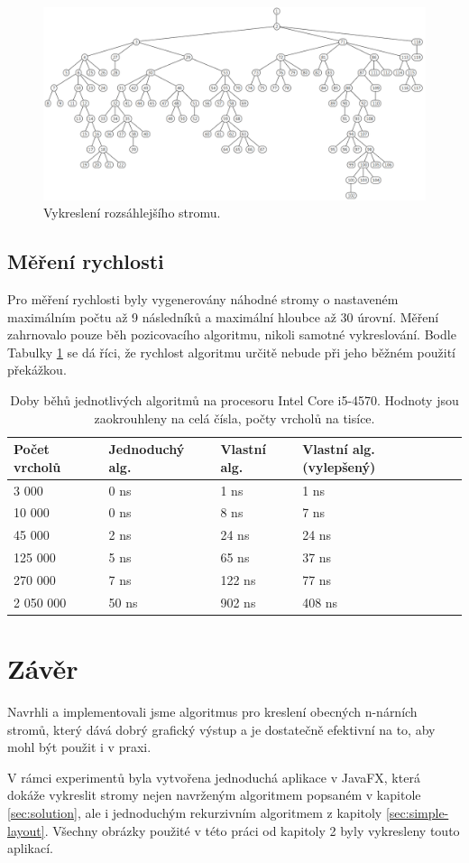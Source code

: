 \documentclass[12pt, a4paper]{report}
\begin{document}
\begin{figure}
	\centering
	\includegraphics[width=1\linewidth]{img-my-layout-large}
	\caption{Vykreslení rozsáhlejšího stromu.}
	\label{fig:my-layout-large}
\end{figure}

\section{Měření rychlosti}
Pro měření rychlosti byly vygenerovány náhodné stromy o nastaveném maximálním počtu až 9 následníků a maximální hloubce až 30 úrovní. Měření zahrnovalo pouze běh pozicovacího algoritmu, nikoli samotné vykreslování.
Bodle Tabulky \ref{tbl:performance} se dá říci, že rychlost algoritmu určitě nebude při jeho běžném použití překážkou.

\begin{table}
	\caption{Doby běhů jednotlivých algoritmů na procesoru Intel Core i5-4570. Hodnoty jsou zaokrouhleny na celá čísla, počty vrcholů na tisíce.}
	\centering
	\label{tbl:performance}
	\begin{tabular}{l|llll}
		Počet vrcholů & Jednoduchý alg. & Vlastní alg. & Vlastní alg. (vylepšený) \\
		 \hline
		3 000 & 0 ns & 1 ns & 1 ns \\
		10 000 & 0 ns & 8 ns & 7 ns \\
		45 000 & 2 ns & 24 ns & 24 ns \\
		125 000 & 5 ns & 65 ns & 37 ns \\
		270 000 & 7 ns & 122 ns & 77 ns \\
		2 050 000 & 50 ns & 902 ns & 408 ns \\
	\end{tabular}
\end{table}


\chapter{Závěr}
Navrhli a implementovali jsme algoritmus pro kreslení obecných n-nárních stromů, který dává dobrý grafický výstup a je dostatečně efektivní na to, aby mohl být použit i v praxi.

V rámci experimentů byla vytvořena jednoduchá aplikace v JavaFX, která dokáže vykreslit stromy nejen navrženým algoritmem popsaném v kapitole \ref{sec:solution}, ale i jednoduchým rekurzivním algoritmem z kapitoly \ref{sec:simple-layout}. Všechny obrázky použité v této práci od kapitoly 2 byly vykresleny touto aplikací.



\end{document}
